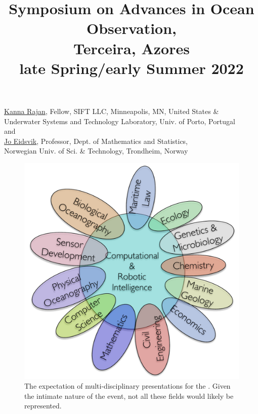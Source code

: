 \documentclass[10pt,letterpaper]{article}
\title{Symposium on Advances in Ocean Observation,\\
  Terceira, Azores \\ \large{\textbf{late Spring/early Summer 2022}}}
\date{}
\begin{document}
\maketitle{}

\vspace{-1.75cm}
\begin{center}
  \href{https://kanna.rajan.systems}{\textsf{Kanna Rajan}},
  Fellow, SIFT LLC, Minneapolis, MN, United States \& \\Underwater Systems and Technology
  Laboratory, Univ. of Porto, Portugal\\
  and\\
  \href{https://www.ntnu.edu/employees/jo.eidsvik}{\textsf{Jo Eidsvik}},
  Professor, Dept. of Mathematics and Statistics, \\Norwegian Univ. of
  Sci. \& Technology, Trondheim, Norway\\
\end{center}

\begin{figure}
  \vspace{-0.5cm}
  \centering 
  \includegraphics[scale=0.4]{fig/disciplines.pdf}
  \caption{The expectation of multi-disciplinary presentations for the
    \sympe. Given the intimate nature of the event, not all these
    fields would likely be represented.}
  \label{fig:concept}
  \vspace{-0.5cm}
\end{figure}
\end{document}
